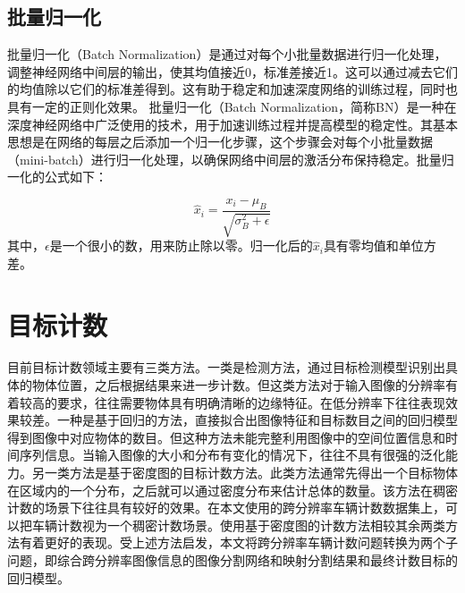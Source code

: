 \subsection{批量归一化}
批量归一化（Batch Normalization）\cite{2015BatchNormalizationAcceleratingDeepNetworkTrainingReducingInternalCovariateShift}是通过对每个小批量数据进行归一化处理，调整神经网络中间层的输出，使其均值接近0，标准差接近1。这可以通过减去它们的均值除以它们的标准差得到。这有助于稳定和加速深度网络的训练过程，同时也具有一定的正则化效果。
批量归一化（Batch Normalization，简称BN）是一种在深度神经网络中广泛使用的技术，用于加速训练过程并提高模型的稳定性。其基本思想是在网络的每层之后添加一个归一化步骤，这个步骤会对每个小批量数据（mini-batch）进行归一化处理，以确保网络中间层的激活分布保持稳定。批量归一化的公式如下：

\begin{equation}
  \hat{x}_i = \frac{x_i - \mu_B}{\sqrt{\sigma_B^2 + \epsilon}} 
\end{equation}
其中，$\epsilon$是一个很小的数，用来防止除以零。归一化后的\(\hat{x}_i\)具有零均值和单位方差。
\section{目标计数}
目前目标计数领域主要有三类方法。一类是检测方法\cite{2015FastRCNN}\cite{2016FasterRCNNRealTimeObjectDetectionRegionProposalNetworks}\cite{2018YOLOv3IncrementalImprovement}\cite{2018MaskRCNN}\cite{2019ObjectDetectionCountObjectsImageusingTensorFlowObjectDetectionAPI}，通过目标检测模型识别出具体的物体位置，之后根据结果来进一步计数。但这类方法对于输入图像的分辨率有着较高的要求，往往需要物体具有明确清晰的边缘特征。在低分辨率下往往表现效果较差。一种是基于回归的方法\cite{2009BayesianPoissonRegressionCrowdCounting}\cite{2013MultisourceMultiscaleCountingExtremelyDenseCrowdImages}\cite{2009CrowdCountingUsingMultipleLocalFeatures}，直接拟合出图像特征和目标数目之间的回归模型得到图像中对应物体的数目。但这种方法未能完整利用图像中的空间位置信息和时间序列信息。当输入图像的大小和分布有变化的情况下，往往不具有很强的泛化能力。另一类方法是基于密度图的目标计数方法\cite{2018CSRNetDilatedConvolutionalNeuralNetworksUnderstandingHighlyCongestedScenesa}\cite{2016SingleImageCrowdCountingMultiColumnConvolutionalNeuralNetwork}\cite{2018CrowdCountingusingDeepRecurrentSpatialAwareNetwork}\cite{2018VehicleDetectionCountingHighResolutionAerialImagesUsingConvolutionalRegressionNeuralNetwork}。此类方法通常先得出一个目标物体在区域内的一个分布，之后就可以通过密度分布来估计总体的数量。该方法在稠密计数的场景下往往具有较好的效果。在本文使用的跨分辨率车辆计数数据集上，可以把车辆计数视为一个稠密计数场景。使用基于密度图的计数方法相较其余两类方法有着更好的表现。受上述方法启发，本文将跨分辨率车辆计数问题转换为两个子问题，即综合跨分辨率图像信息的图像分割网络和映射分割结果和最终计数目标的回归模型。

